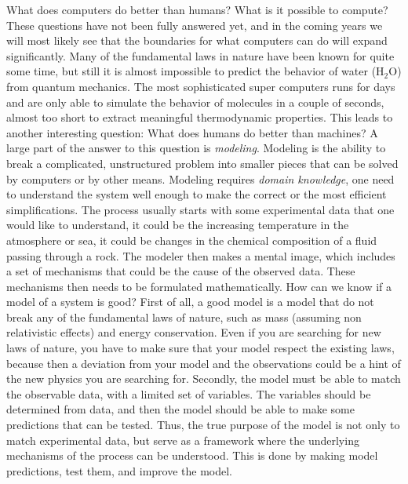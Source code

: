 \documentclass[graybox,sectrefs,envcountresetchap,open=right,final]{svmonodo}
\begin{document}
What does computers do better than humans? What is it possible to
compute? These questions have not been fully answered yet, and in the
coming years we will most likely see that the boundaries for what
computers can do will expand significantly. Many of the  fundamental laws in
nature have been known for quite some time, but still it is almost
impossible to predict the behavior of water (H$_2$O) from quantum
mechanics. The most sophisticated super computers runs for days and are
only able to simulate  the behavior of molecules in a couple of
seconds, almost too short to extract meaningful thermodynamic
properties. This leads to another interesting question: What does humans do better
than machines? A large part of
the answer to this question is \emph{modeling}. Modeling is the ability to 
break a complicated, unstructured problem into smaller pieces that can
be solved by computers or by other means. Modeling requires \emph{domain knowledge}, one need to
understand the system well enough to make the correct or the most efficient simplifications. The process usually starts
with some experimental data that one would like to understand, it could be the increasing temperature in the atmosphere or sea, it could 
be changes in the chemical composition of a fluid passing through a rock. The modeler then makes a mental image, which includes a set of 
mechanisms that could be the cause of the observed data. These mechanisms then needs to be formulated mathematically.   
How can we know if a model of a system is good? First of all, a good model is a model that do not break 
any of the fundamental laws of nature, such as mass (assuming non relativistic effects) and energy conservation. Even if you are searching 
for new laws of nature, you have to make sure that your model respect the existing laws, because then a deviation from your model and
the observations could be a hint of the new physics you are searching for.  
Secondly, the model must be able to match the observable data, with a limited set of variables. The variables should 
be determined from data, and then the model should be able to make some predictions that can be tested. Thus, the true
purpose of the model is not only to match experimental data, but serve as a framework where the underlying
mechanisms of the process can be understood. This is done by making model predictions, test them, and improve the model.
\end{document}
